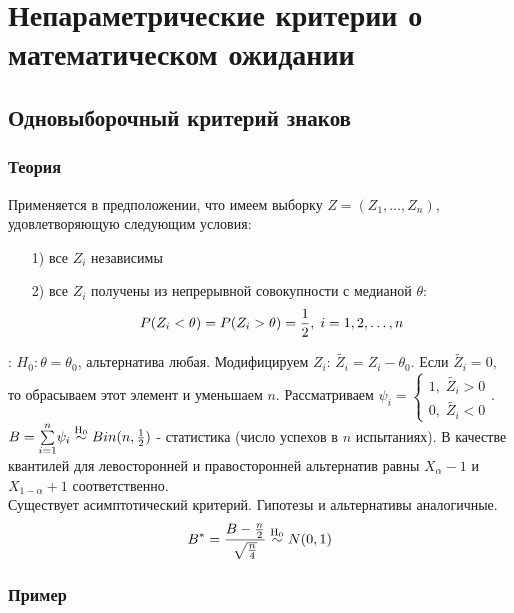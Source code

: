 \section{Непараметрические критерии о математическом ожидании}\label{cha:1sample/sec:neparam}

\subsection{Одновыборочный критерий знаков}\label{cha:1sample/sec:neparam/subsec:znak}

\subsubsection*{Теория}\label{cha:1sample/sec:neparam/subsec:znak/subsubsec:theory}

Применяется в предположении, что имеем выборку $Z = (Z_1, \dots, Z_n)$, удовлетворяющую следующим условия:
\begin{itemize}
	\item[1)] все $Z_i$ независимы
	\item[2)] все $Z_i$ получены из непрерывной совокупности с медианой $\theta$:
	$$P(Z_i < \theta) = P(Z_i > \theta) = \frac{1}{2}, \; i = 1,2,\dots,n$$ 
\end{itemize}
: $H_0: \theta = \theta_0$, альтернатива любая.
Модифицируем $Z_i$: $\tilde{Z_i} = Z_i - \theta_0$. Если $\tilde{Z_i} = 0$, то обрасываем этот элемент и уменьшаем $n$. Рассматриваем $\psi_i = \begin{cases}
	1, \; \tilde{Z_i} > 0 \\
	0, \; \tilde{Z_i} < 0 
\end{cases}$. $B = \underset{i=1}{\overset{n}{\sum}}\psi_i \mathrel{\stackrel{\rm H_0}\sim} Bin (n, \frac{1}{2})$ - статистика (число успехов в $n$ испытаниях). В качестве квантилей для левосторонней и правосторонней альтернатив равны $X_{\alpha} - 1$ и $X_{1-\alpha}+1$ соответственно. \\

Существует асимптотический критерий. Гипотезы и альтернативы аналогичные.
$$B^{*} = \frac{B - \frac{n}{2}}{\sqrt{\frac{n}{4}}} \mathrel{\stackrel{\rm H_0}\sim} N(0,1)$$

\subsubsection*{Пример}\label{cha:1sample/sec:neparam/subsec:znak/subsubsec:python}


